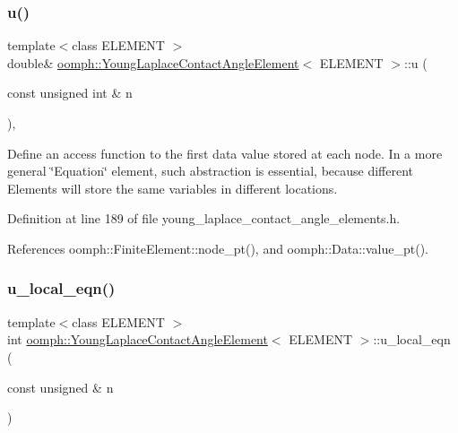 \subsubsection{\texorpdfstring{u()}{u()}}
{\footnotesize\ttfamily template$<$class E\+L\+E\+M\+E\+NT $>$ \\
double\& \hyperlink{classoomph_1_1YoungLaplaceContactAngleElement}{oomph\+::\+Young\+Laplace\+Contact\+Angle\+Element}$<$ E\+L\+E\+M\+E\+NT $>$\+::u (\begin{DoxyParamCaption}\item[{const unsigned int \&}]{n }\end{DoxyParamCaption})\hspace{0.3cm}{\ttfamily [inline]}, {\ttfamily [protected]}}



Define an access function to the first data value stored at each node. In a more general \char`\"{}\+Equation\char`\"{} element, such abstraction is essential, because different Elements will store the same variables in different locations. 



Definition at line 189 of file young\+\_\+laplace\+\_\+contact\+\_\+angle\+\_\+elements.\+h.



References oomph\+::\+Finite\+Element\+::node\+\_\+pt(), and oomph\+::\+Data\+::value\+\_\+pt().

\mbox{\label{classoomph_1_1YoungLaplaceContactAngleElement_a0469df9bf4d8888312929e66821dc408}} 
\subsubsection{\texorpdfstring{u\+\_\+local\+\_\+eqn()}{u\_local\_eqn()}}
{\footnotesize\ttfamily template$<$class E\+L\+E\+M\+E\+NT $>$ \\
int \hyperlink{classoomph_1_1YoungLaplaceContactAngleElement}{oomph\+::\+Young\+Laplace\+Contact\+Angle\+Element}$<$ E\+L\+E\+M\+E\+NT $>$\+::u\+\_\+local\+\_\+eqn (\begin{DoxyParamCaption}\item[{const unsigned \&}]{n }\end{DoxyParamCaption})\hspace{0.3cm}{\ttfamily [inline]}}



